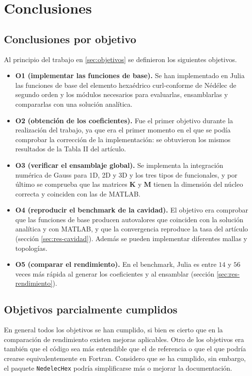 \documentclass[12pt]{report} %
\begin{document}
\section{Conclusiones}\label{sec:conclusiones}
\subsection{Conclusiones por objetivo}
Al principio del trabajo en \autoref{sec:objetivos} se definieron los siguientes objetivos.

\begin{itemize}
	\item \textbf{O1 (implementar las funciones de base).} Se han implementado en Julia las funciones de base del elemento hexaédrico curl-conforme de Nédélec de segundo orden y los módulos necesarios para evaluarlas, ensamblarlas y compararlas con una solución analítica.

	\item \textbf{O2 (obtención de los coeficientes).} Fue el primer objetivo durante la realización del trabajo, ya que era el primer momento en el que se podía comprobar la corrección de la implementación: se obtuvieron los mismos resultados de la Tabla II del artículo.

	\item \textbf{O3 (verificar el ensamblaje global).} Se implementa la integración numérica de Gauss para 1D, 2D y 3D y los tres tipos de funcionales, y por último se comprueba que las matrices $\mathbf{K}$ y $\mathbf{M}$ tienen la dimensión del núcleo correcta y coinciden con las de MATLAB.

	\item \textbf{O4 (reproducir el benchmark de la cavidad).} El objetivo era comprobar que las funciones de base producen autovalores que coinciden con la solución analítica y con MATLAB, y que la convergencia reproduce la tasa del artículo (sección \ref{sec:res-cavidad}). Además se pueden implementar diferentes mallas y topologías.

	\item \textbf{O5 (comparar el rendimiento).} En el benchmark, Julia es entre $14$ y $56$ veces más rápida al generar los coeficientes y al ensamblar (sección \ref{sec:res-rendimiento}).
\end{itemize}

\subsection{Objetivos parcialmente cumplidos}
En general todos los objetivos se han cumplido, si bien es cierto que en la comparación de rendimiento existen mejoras aplicables. Otro de los objetivos era también que el código sea más entendible que el de referencia o que el que podría crearse equivalentemente en Fortran. Considero que se ha cumplido, sin embargo, el paquete \texttt{NedelecHex} podría simplificarse más o mejorar la documentación.
\end{document}
